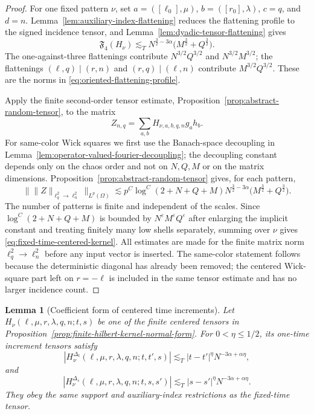 \documentclass[10pt]{amsart}
\numberwithin{equation}{section}
\theoremstyle{plain}
\newtheorem{lemma}[theorem]{Lemma}
\theoremstyle{definition}
\theoremstyle{remark}
\newcommand{\eps}{\varepsilon}
\begin{document}
\begin{proof}
For one fixed pattern $\nu$, set $a=([\ell_0],\mu)$, $b=([r_0],\lambda)$, $c=q$, and $d=n$.  Lemma~\ref{lem:auxiliary-index-flattening} reduces the flattening profile to the signed incidence tensor, and Lemma~\ref{lem:dyadic-tensor-flattening} gives
\begin{equation}\label{eq:fixed-time-proof-profile}
        \mathfrak F_4(H_\nu)
        \lesssim_T
        N^{\frac32-3\alpha}\bigl(M^{\frac32}+Q^{\frac32}\bigr).
\end{equation}
The one-against-three flattenings contribute $N^{3/2}Q^{3/2}$ and $N^{3/2}M^{3/2}$; the flattenings $(\ell,q)\mid(r,n)$ and $(r,q)\mid(\ell,n)$ contribute $M^{3/2}Q^{3/2}$.  These are the norms in \eqref{eq:oriented-flattening-profile}.

Apply the finite second-order tensor estimate, Proposition~\ref{prop:abstract-random-tensor}, to the matrix
\[
        Z_{n,q}=\sum_{a,b}H_{\nu,a,b,q,n}g_ah_b .
\]
For same-color Wick squares we first use the Banach-space decoupling in Lemma~\ref{lem:operator-valued-fourier-decoupling}; the decoupling constant depends only on the chaos order and not on $N,Q,M$ or on the matrix dimensions.  Proposition~\ref{prop:abstract-random-tensor} gives, for each pattern,
\[
 \bigl\|\|Z\|_{\ell^2_q\to\ell^2_n}\bigr\|_{L^p(\Omega)}
 \lesssim p^C\log^C(2+N+Q+M)
 N^{\frac32-3\alpha}\bigl(M^{\frac32}+Q^{\frac32}\bigr).
\]
The number of patterns is finite and independent of the scales.  Since $\log^C(2+N+Q+M)$ is bounded by $N^{\eps}M^{\eps}Q^{\eps}$ after enlarging the implicit constant and treating finitely many low shells separately, summing over $\nu$ gives \eqref{eq:fixed-time-centered-kernel}.  All estimates are made for the finite matrix norm $\ell_q^2\to\ell_n^2$ before any input vector is inserted.  The same-color statement follows because the deterministic diagonal has already been removed; the centered Wick-square part left on $r=-\ell$ is included in the same tensor estimate and has no larger incidence count.
\end{proof}


\begin{lemma}[Coefficient form of centered time increments]\label{lem:centered-increment-coefficients}
Let $H_\nu(\ell,\mu,r,\lambda,q,n;t,s)$ be one of the finite centered tensors in Proposition~\ref{prop:finite-hilbert-kernel-normal-form}.  For $0<\eta\le1/2$, its one-time increment tensors satisfy
\[
        |H^{\Delta_t}_\nu(\ell,\mu,r,\lambda,q,n;t,t',s)|
        \lesssim_T |t-t'|^\eta N^{-3\alpha+\alpha\eta},
\]
and
\[
        |H^{\Delta_s}_\nu(\ell,\mu,r,\lambda,q,n;t,s,s')|
        \lesssim_T |s-s'|^\eta N^{-3\alpha+\alpha\eta}.
\]
They obey the same support and auxiliary-index restrictions as the fixed-time tensor.
\end{lemma}
\end{document}
